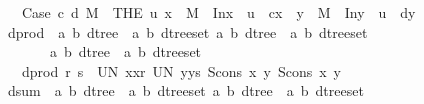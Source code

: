 \begin{isabellebody}
\ \ \ {\isachardoublequoteopen}Case\ c\ d\ M\ {\isacharequal}{\isacharequal}\ THE\ u{\isachardot}\ {\isacharparenleft}{\isasymexists}x\ {\isachardot}\ M\ {\isacharequal}\ In{}{\isacharparenleft}x{\isacharparenright}\ {\isasymand}\ u\ {\isacharequal}\ c{\isacharparenleft}x{\isacharparenright}{\isacharparenright}\ {\isasymor}\ {\isacharparenleft}{\isasymexists}y\ {\isachardot}\ M\ {\isacharequal}\ In{}{\isacharparenleft}y{\isacharparenright}\ {\isasymand}\ u\ {\isacharequal}\ d{\isacharparenleft}y{\isacharparenright}{\isacharparenright}{\isachardoublequoteclose}\isanewline
\isanewline
\isanewline
\isanewline
\isanewline
{}\isamarkupfalse%
\ dprod\ {\isacharcolon}{\isacharcolon}\ {\isachardoublequoteopen}{\isacharbrackleft}{\isacharparenleft}{\isacharparenleft}{\isacharprime}a{\isacharcomma}\ {\isacharprime}b{\isacharparenright}\ dtree\ {\isacharasterisk}\ {\isacharparenleft}{\isacharprime}a{\isacharcomma}\ {\isacharprime}b{\isacharparenright}\ dtree{\isacharparenright}set{\isacharcomma}\ {\isacharparenleft}{\isacharparenleft}{\isacharprime}a{\isacharcomma}\ {\isacharprime}b{\isacharparenright}\ dtree\ {\isacharasterisk}\ {\isacharparenleft}{\isacharprime}a{\isacharcomma}\ {\isacharprime}b{\isacharparenright}\ dtree{\isacharparenright}set{\isacharbrackright}\isanewline
\ \ \ \ \ \ {\isacharequal}{\isachargreater}\ {\isacharparenleft}{\isacharparenleft}{\isacharprime}a{\isacharcomma}\ {\isacharprime}b{\isacharparenright}\ dtree\ {\isacharasterisk}\ {\isacharparenleft}{\isacharprime}a{\isacharcomma}\ {\isacharprime}b{\isacharparenright}\ dtree{\isacharparenright}set{\isachardoublequoteclose}\isanewline
\ \ \ {\isachardoublequoteopen}dprod\ r\ s\ {\isacharequal}{\isacharequal}\ UN\ {\isacharparenleft}x{\isacharcomma}x{\isacharprime}{\isacharparenright}{\isacharcolon}r{\isachardot}\ UN\ {\isacharparenleft}y{\isacharcomma}y{\isacharprime}{\isacharparenright}{\isacharcolon}s{\isachardot}\ {\isacharbraceleft}{\isacharparenleft}Scons\ x\ y{\isacharcomma}\ Scons\ x{\isacharprime}\ y{\isacharprime}{\isacharparenright}{\isacharbraceright}{\isachardoublequoteclose}\isanewline
\isanewline
{}\isamarkupfalse%
\ dsum\ {\isacharcolon}{\isacharcolon}\ {\isachardoublequoteopen}{\isacharbrackleft}{\isacharparenleft}{\isacharparenleft}{\isacharprime}a{\isacharcomma}\ {\isacharprime}b{\isacharparenright}\ dtree\ {\isacharasterisk}\ {\isacharparenleft}{\isacharprime}a{\isacharcomma}\ {\isacharprime}b{\isacharparenright}\ dtree{\isacharparenright}set{\isacharcomma}\ {\isacharparenleft}{\isacharparenleft}{\isacharprime}a{\isacharcomma}\ {\isacharprime}b{\isacharparenright}\ dtree\ {\isacharasterisk}\ {\isacharparenleft}{\isacharprime}a{\isacharcomma}\ {\isacharprime}b{\isacharparenright}\ dtree{\isacharparenright}set{\isacharbrackright}\isanewline

\end{isabellebody}
